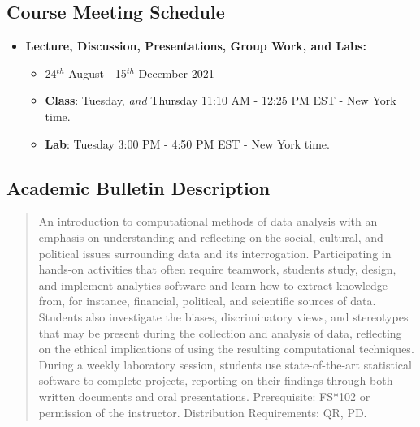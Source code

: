 \documentclass[11pt]{article} %
\begin{document}
\subsection*{Course Meeting Schedule}

\begin{itemize}
  \item \textbf{Lecture, Discussion, Presentations, Group Work, and Labs:}
  \begin{itemize}
    \item 24$^{th}$ August - 15$^{th}$ December 2021
    \item \textbf{Class}: Tuesday, \emph{and} Thursday 11:10 AM - 12:25 PM EST - New York time. 
    \item \textbf{Lab}: Tuesday 3:00 PM - 4:50 PM EST - New York time.
  \end{itemize}
\end{itemize}





\subsection*{\textbf{Academic Bulletin Description}}

\begin{quote}


An introduction to computational methods of data analysis with an emphasis on understanding and reflecting on the social, cultural, and political issues surrounding data and its interrogation. Participating in hands-on activities that often require teamwork, students study, design, and implement analytics software and learn how to extract knowledge from, for instance, financial, political, and scientific sources of data. Students also investigate the biases, discriminatory views, and stereotypes that may be present during the collection and analysis of data, reflecting on the ethical implications of using the resulting computational techniques. During a weekly laboratory session, students use state-of-the-art statistical software to complete projects, reporting on their findings through both written documents and oral presentations. Prerequisite: FS*102 or permission of the instructor. Distribution Requirements: QR, PD.

\end{quote}
\end{document}
